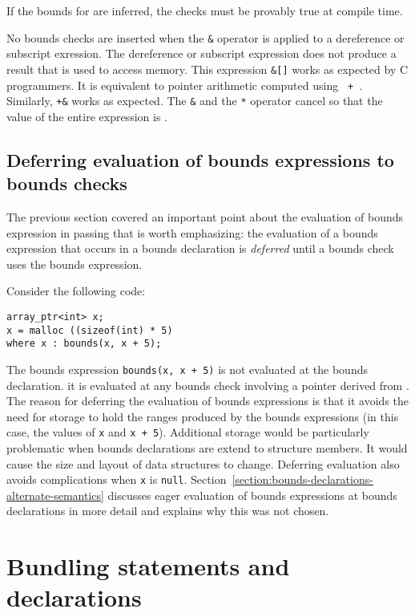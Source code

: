 If the bounds for  are inferred, the checks
must be provably true at compile time.

No bounds checks are inserted when the \texttt{\&} operator is applied to
a dereference or subscript exression.
The dereference or subscript expression does not produce a result that is used
to access memory.  This expression \texttt{\&[]} works as
expected by C programmers.  It is equivalent to pointer arithmetic computed using
\texttt{ + }.   Similarly, \texttt{+\&} works
as expected.  The \texttt{\&} and the \texttt{*} operator cancel so that
the value of the entire expression is .

\subsection{Deferring evaluation of bounds expressions to bounds checks}

The previous section covered an important point about the evaluation of
bounds expression in passing that is worth emphasizing:
the evaluation of a bounds expression that occurs in
a bounds declaration is {\em deferred} until a bounds check uses the
bounds expression.

Consider the following code:

\begin{lstlisting}
array_ptr<int> x;
x = malloc ((sizeof(int) * 5)
where x : bounds(x, x + 5);
\end{lstlisting}

The bounds expression \texttt{bounds(x, x + 5)} is not evaluated at the
bounds declaration.   it is evaluated at any bounds check involving a
pointer derived from .  The reason for deferring the
evaluation of bounds expressions is that it avoids the need for
storage to hold the ranges produced by the bounds
expressions (in this case, the values of \texttt{x} and \texttt{x + 5}).
Additional storage would be particularly
problematic when bounds declarations are extend to structure members.
It would cause the size and layout of data structures to change.
Deferring evaluation also avoids complications when \texttt{x} is
\texttt{null}. Section~\ref{section:bounds-declarations-alternate-semantics} 
discusses eager evaluation of bounds expressions at
bounds declarations in more detail and explains why this was not chosen.

\section{Bundling statements and declarations}

